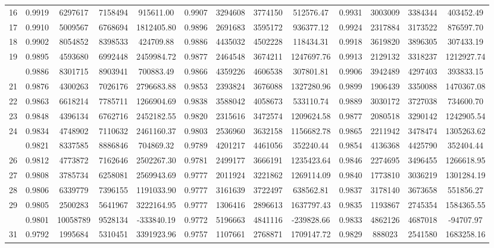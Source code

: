 \documentclass[
  12pt,
]{article}
\begin{document}
\begin{longtable}[t]{lcccccccccccc}
16 & 0.9919 & 6297617 & 7158494 & 915611.00 & 0.9907 & 3294608 & 3774150 & 512576.47 & 0.9931 & 3003009 & 3384344 & 403452.49\\
17 & 0.9910 & 5009567 & 6768694 & 1812405.80 & 0.9896 & 2691683 & 3595172 & 936377.12 & 0.9924 & 2317884 & 3173522 & 876597.70\\
18 & 0.9902 & 8054852 & 8398533 & 424709.88 & 0.9886 & 4435032 & 4502228 & 118434.31 & 0.9918 & 3619820 & 3896305 & 307433.19\\
19 & 0.9895 & 4593680 & 6992448 & 2459984.72 & 0.9877 & 2464548 & 3674211 & 1247697.76 & 0.9913 & 2129132 & 3318237 & 1212927.74\\
\addlinespace
20 & 0.9886 & 8301715 & 8903941 & 700883.49 & 0.9866 & 4359226 & 4606538 & 307801.81 & 0.9906 & 3942489 & 4297403 & 393833.15\\
21 & 0.9876 & 4300263 & 7026176 & 2796683.88 & 0.9853 & 2393824 & 3676088 & 1327280.96 & 0.9899 & 1906439 & 3350088 & 1470367.08\\
22 & 0.9863 & 6618214 & 7785711 & 1266904.69 & 0.9838 & 3588042 & 4058673 & 533110.74 & 0.9889 & 3030172 & 3727038 & 734600.70\\
23 & 0.9848 & 4396134 & 6762716 & 2452182.55 & 0.9820 & 2315616 & 3472574 & 1209624.58 & 0.9877 & 2080518 & 3290142 & 1242905.54\\
24 & 0.9834 & 4748902 & 7110632 & 2461160.37 & 0.9803 & 2536960 & 3632158 & 1156682.78 & 0.9865 & 2211942 & 3478474 & 1305263.62\\
\addlinespace
25 & 0.9821 & 8337585 & 8886846 & 704869.32 & 0.9789 & 4201217 & 4461056 & 352240.44 & 0.9854 & 4136368 & 4425790 & 352404.44\\
26 & 0.9812 & 4773872 & 7162646 & 2502267.30 & 0.9781 & 2499177 & 3666191 & 1235423.64 & 0.9846 & 2274695 & 3496455 & 1266618.95\\
27 & 0.9808 & 3785734 & 6258081 & 2569943.69 & 0.9777 & 2011924 & 3221862 & 1269114.09 & 0.9840 & 1773810 & 3036219 & 1301284.19\\
28 & 0.9806 & 6339779 & 7396155 & 1191033.90 & 0.9777 & 3161639 & 3722497 & 638562.81 & 0.9837 & 3178140 & 3673658 & 551856.27\\
29 & 0.9805 & 2500283 & 5641967 & 3222164.95 & 0.9777 & 1306416 & 2896613 & 1637797.43 & 0.9835 & 1193867 & 2745354 & 1584365.55\\
\addlinespace
30 & 0.9801 & 10058789 & 9528134 & -333840.19 & 0.9772 & 5196663 & 4841116 & -239828.66 & 0.9833 & 4862126 & 4687018 & -94707.97\\
31 & 0.9792 & 1995684 & 5310451 & 3391923.96 & 0.9757 & 1107661 & 2768871 & 1709147.72 & 0.9829 & 888023 & 2541580 & 1683258.16\\

\end{longtable}
\end{document}
